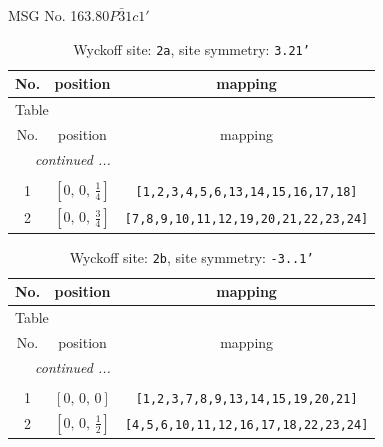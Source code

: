 \documentclass[fleqn,8pt]{jsarticle}
\begin{document}
\setcounter{MaxMatrixCols}{32}

\renewcommand{\tablename}{Table~}
\renewcommand{\figurename}{Figure~}
\begin{center}
\LARGE
MSG No. 163.80\quad$P\bar{3}1c1'$
\end{center}
\renewcommand{\arraystretch}{1.2}
\begin{longtable}{ccc}
\caption{Wyckoff site: {\tt 2a}, site symmetry: {\tt 3.21'}}
 \\
 \hline \hline
No. & position & mapping \\ \hline \endfirsthead

\multicolumn{2}{l}{\tablename\ \thetable{}} \\
 \hline \hline
No. & position & mapping \\ \hline \endhead

 \hline \hline
\multicolumn{2}{r}{\footnotesize\it continued ...} \\ \endfoot

 \hline \hline
\multicolumn{2}{r}{} \\ \endlastfoot

1 & $\left[ 0,\, 0,\, \frac{1}{4} \right]$ & {\tt [1,2,3,4,5,6,13,14,15,16,17,18]} \\ \hline
2 & $\left[ 0,\, 0,\, \frac{3}{4} \right]$ & {\tt [7,8,9,10,11,12,19,20,21,22,23,24]} \\
\end{longtable}
\renewcommand{\arraystretch}{1.2}
\begin{longtable}{ccc}
\caption{Wyckoff site: {\tt 2b}, site symmetry: {\tt -3..1'}}
 \\
 \hline \hline
No. & position & mapping \\ \hline \endfirsthead

\multicolumn{2}{l}{\tablename\ \thetable{}} \\
 \hline \hline
No. & position & mapping \\ \hline \endhead

 \hline \hline
\multicolumn{2}{r}{\footnotesize\it continued ...} \\ \endfoot

 \hline \hline
\multicolumn{2}{r}{} \\ \endlastfoot

1 & $\left[ 0,\, 0,\, 0 \right]$ & {\tt [1,2,3,7,8,9,13,14,15,19,20,21]} \\ \hline
2 & $\left[ 0,\, 0,\, \frac{1}{2} \right]$ & {\tt [4,5,6,10,11,12,16,17,18,22,23,24]} \\
\end{longtable}
\end{document}
